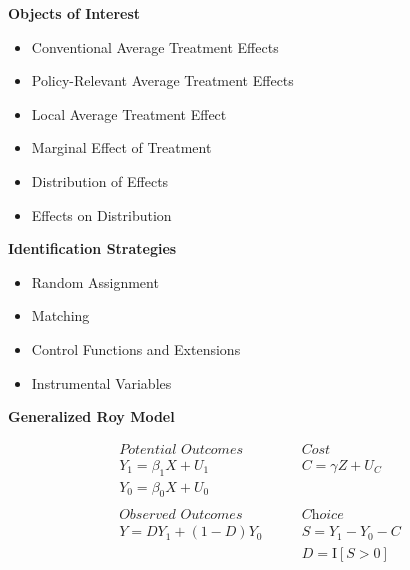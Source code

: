 \begin{frame}\textbf{Objects of Interest}\vspace{0.3cm}

\begin{itemize}\setlength\itemsep{1em}
\item Conventional Average Treatment Effects
\item Policy-Relevant Average Treatment Effects
\item Local Average Treatment Effect
\item Marginal Effect of Treatment
\item Distribution of Effects
\item Effects on Distribution
\end{itemize}

\end{frame}
\begin{frame}\textbf{Identification Strategies}\vspace{0.3cm}

\begin{itemize}\setlength\itemsep{1em}
\item Random Assignment
\item Matching
\item Control Functions and Extensions
\item Instrumental Variables
\end{itemize}

\end{frame}%
\begin{frame}\textbf{Generalized Roy Model}

\begin{align*}
\textit{Potential Outcomes} &\qquad \textit{Cost} \\
Y_1 = \beta_1 X + U_1      &\qquad C = \gamma Z + U_C \\
Y_0 = \beta_0 X + U_0      &\qquad \\
    & \\
\textit{Observed Outcomes } &\qquad \textit{Choice} \\
Y = D Y_1 + (1 - D)Y_0 &\qquad S = Y_1 - Y_0 - C \\
                       &\qquad D = \mathrm{I}[S > 0] \\
\end{align*}

\end{frame}

